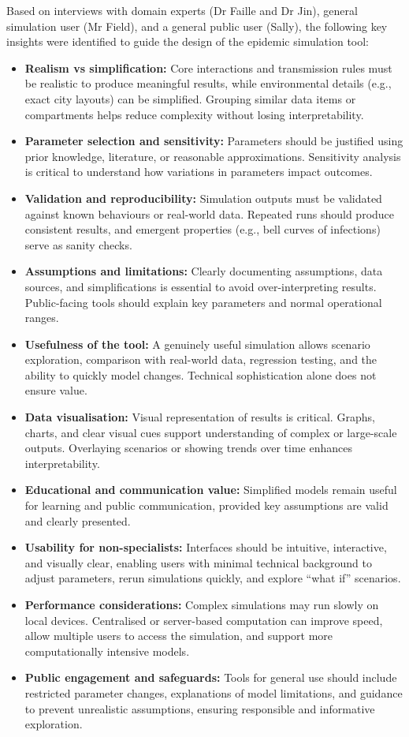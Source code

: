 Based on interviews with domain experts (Dr Faille and Dr Jin), general simulation user (Mr Field), and a general public user (Sally), the following key insights were identified to guide the design of the epidemic simulation tool:
\begin{itemize}
  \item \textbf{Realism vs simplification:} Core interactions and transmission rules must be realistic to produce meaningful results, while environmental details (e.g., exact city layouts) can be simplified. Grouping similar data items or compartments helps reduce complexity without losing interpretability.
  \item \textbf{Parameter selection and sensitivity:} Parameters should be justified using prior knowledge, literature, or reasonable approximations. Sensitivity analysis is critical to understand how variations in parameters impact outcomes.
  \item \textbf{Validation and reproducibility:} Simulation outputs must be validated against known behaviours or real-world data. Repeated runs should produce consistent results, and emergent properties (e.g., bell curves of infections) serve as sanity checks.
  \item \textbf{Assumptions and limitations:} Clearly documenting assumptions, data sources, and simplifications is essential to avoid over-interpreting results. Public-facing tools should explain key parameters and normal operational ranges.
  \item \textbf{Usefulness of the tool:} A genuinely useful simulation allows scenario exploration, comparison with real-world data, regression testing, and the ability to quickly model changes. Technical sophistication alone does not ensure value.
  \item \textbf{Data visualisation:} Visual representation of results is critical. Graphs, charts, and clear visual cues support understanding of complex or large-scale outputs. Overlaying scenarios or showing trends over time enhances interpretability.
  \item \textbf{Educational and communication value:} Simplified models remain useful for learning and public communication, provided key assumptions are valid and clearly presented.
  \item \textbf{Usability for non-specialists:} Interfaces should be intuitive, interactive, and visually clear, enabling users with minimal technical background to adjust parameters, rerun simulations quickly, and explore “what if” scenarios.
  \item \textbf{Performance considerations:} Complex simulations may run slowly on local devices. Centralised or server-based computation can improve speed, allow multiple users to access the simulation, and support more computationally intensive models.
  \item \textbf{Public engagement and safeguards:} Tools for general use should include restricted parameter changes, explanations of model limitations, and guidance to prevent unrealistic assumptions, ensuring responsible and informative exploration.
\end{itemize}
